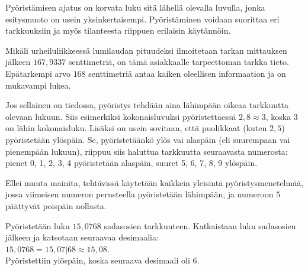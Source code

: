 Pyöristämisen ajatus on korvata luku sitä lähellä olevalla luvulla, jonka esitysmuoto on usein yksinkertaisempi. Pyöristäminen voidaan suorittaa eri tarkkuuksiin ja myös tilanteesta riippuen erilaisin käytännöin.%




\begin{esimerkki}
Mikäli urheiluliikkeessä lumilaudan pituudeksi ilmoitetaan tarkan mittauksen jälkeen $167,9337$ senttimetriä, on tämä asiakkaalle tarpeettoman tarkka tieto. Epätarkempi arvo $168$ senttimetriä antaa kaiken oleellisen informaation ja on mukavampi lukea.
\end{esimerkki}

Jos sellainen on tiedossa, pyöristys tehdään aina lähimpään oikeaa tarkkuutta olevaan lukuun. Siis esimerkiksi kokonaisluvuksi pyöristettäessä $2,8 \approx 3$, koska $3$ on lähin kokonaisluku. Lisäksi on usein sovitaan, että puolikkaat (kuten $2,5$) pyöristetään ylöspäin. Se, pyöristetäänkö ylös vai alaspäin (eli suurempaan vai pienempään lukuun), riippuu siis haluttua tarkkuutta seuraavasta numerosta: pienet 0, 1, 2, 3, 4 pyöristetään alaspäin, suuret 5, 6, 7, 8, 9 ylöspäin.

Ellei muuta mainita, tehtävissä käytetään kaikkein yleisintä pyöristysmenetelmää, jossa viimeisen numeron perusteella pyöristetään lähimpään, ja numeroon $5$ päättyvät poispäin nollasta.

\begin{esimerkki}
Pyöristetään luku $15,0768$ sadasosien tarkkuuteen. Katkaistaan luku sadasosien jälkeen ja katsotaan seuraavaa desimaalia:\\
$15,0768 = 15,07|68 \approx 15,08$.\\ %
Pyöristettiin ylöspäin, koska seuraava desimaali oli 6.
\end{esimerkki}

